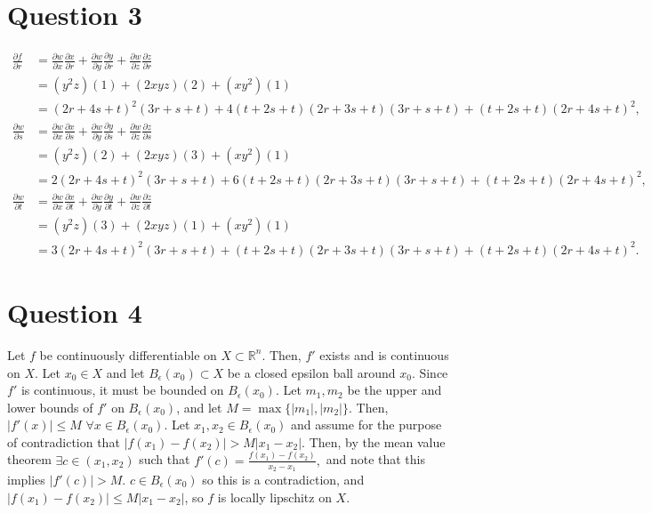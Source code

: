 \documentclass[11pt]{article} %
\begin{document}
\section{Question 3}
\begin{align*}
\frac{\partial f}{\partial r} &= \frac{\partial w}{\partial x}\frac{\partial x}{\partial r} + \frac{\partial w}{\partial y}\frac{\partial y}{\partial r} + \frac{\partial w}{\partial z}\frac{\partial z}{\partial r}\\
&= (y^2z)(1) + (2xyz)(2) + (xy^2)(1) \\
&= (2r+4s+t)^2(3r+s+t) + 4(t+2s+t)(2r+3s+t)(3r+s+t) + (t+2s+t)(2r+4s+t)^2, \\
\frac{\partial w}{\partial s} &= \frac{\partial w}{\partial x}\frac{\partial x}{\partial s} + \frac{\partial w}{\partial y}\frac{\partial y}{\partial s} + \frac{\partial w}{\partial z}\frac{\partial z}{\partial s}\\
&= (y^2z)(2) + (2xyz)(3) + (xy^2)(1)\\
&= 2(2r+4s+t)^2(3r+s+t) + 6(t+2s+t)(2r+3s+t)(3r+s+t) + (t+2s+t)(2r+4s+t)^2, \\
\frac{\partial w}{\partial t} &= \frac{\partial w}{\partial x}\frac{\partial x}{\partial t} + \frac{\partial w}{\partial y}\frac{\partial y}{\partial t} + \frac{\partial w}{\partial z}\frac{\partial z}{\partial t}\\
&= (y^2z)(3) + (2xyz)(1) + (xy^2)(1)\\
&= 3(2r+4s+t)^2(3r+s+t) + (t+2s+t)(2r+3s+t)(3r+s+t) + (t+2s+t)(2r+4s+t)^2 .
\end{align*}
\section{Question 4}
Let $f$ be continuously differentiable on $X \subset \mathbb{R}^n$. Then, $f'$ exists and is continuous on $ X.$ Let $x_0 \in X$ and let $B_{\epsilon}(x_0) \subset X$ be a closed epsilon ball around $x_0$. Since $f'$ is continuous, it must be bounded on $B_{\epsilon}(x_0)$. Let $m_1,m_2$ be the upper and lower bounds of $f'$ on $B_{\epsilon}(x_0)$, and let $M = \max\{|m_1|,|m_2| \}$. Then, $|f'(x)|\leq M$ $\forall x \in B_{\epsilon}(x_0).$ Let $x_1,x_2 \in B_{\epsilon}(x_0)$ and assume for the purpose of contradiction that $|f(x_1) - f(x_2)|>M|x_1 - x_2|$. Then, by the mean value theorem $\exists c \in (x_1,x_2)$ such that $f'(c)=\frac{f(x_1) - f(x_2)}{x_2 - x_1},$ and note that this implies $|f'(c)|>M$. $c \in  B_{\epsilon}(x_0)$ so this is a contradiction, and $|f(x_1) - f(x_2)|\leq M|x_1 - x_2|$, so $f$ is locally lipschitz on $X$.
\end{document}
